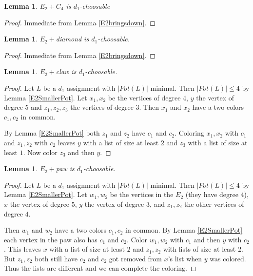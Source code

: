 \documentclass[12pt]{article}
\theoremstyle{plain}
\newtheorem{lem}[thm]{Lemma}
\theoremstyle{definition}
\theoremstyle{remark}
\begin{document}
\begin{lem}\label{E2PlusC4}
$E_2 + C_4$ is $d_1$-choosable
\end{lem}
\begin{proof}
Immediate from Lemma \ref{E2bringsdown}.
\end{proof}
\begin{lem}\label{E2PlusDiamond}
$E_2 +$diamond is $d_1$-choosable.
\end{lem}
\begin{proof}
Immediate from Lemma \ref{E2bringsdown}.
\end{proof}
\begin{lem}\label{E2PlusClaw}
$E_2 + $claw is $d_1$-choosable.
\end{lem}
\begin{proof}
Let $L$ be a $d_1$-assignment with $|Pot(L)|$ minimal. Then  $|Pot(L)| \leq 4$ by Lemma \ref{E2SmallerPot}.  Let $x_1, x_2$ be the vertices of degree $4$, $y$ the vertex of degree $5$ and $z_1, z_2, z_3$ the vertices of degree $3$.  Then $x_1$ and $x_2$ have a two colors $c_1, c_2$ in common.\newline

By Lemma \ref{E2SmallerPot} both $z_1$ and $z_2$ have $c_1$ and $c_2$. Coloring $x_1, x_2$ with $c_1$ and $z_1, z_2$ with $c_2$ leaves $y$ with a list of size at least $2$ and $z_3$ with a list of size at least $1$.  Now color $z_3$ and then $y$.\newline
\end{proof}

\begin{lem}\label{E2PlusPaw}
$E_2 + $paw is $d_1$-choosable.
\end{lem}
\begin{proof}
Let $L$ be a $d_1$-assignment with $|Pot(L)|$ minimal. Then $|Pot(L)| \leq 4$ by Lemma \ref{E2SmallerPot}.  Let $w_1, w_2$ be the vertices in the $E_2$ (they have degree $4$), $x$ the vertex of degree $5$, $y$ the vertex of degree $3$, and $z_1, z_2$ the other vertices of degree $4$.\newline

Then $w_1$ and $w_2$ have a two colors $c_1, c_2$ in common. By Lemma \ref{E2SmallerPot} each vertex in the paw also has $c_1$ and $c_2$.  Color $w_1, w_2$ with $c_1$ and then $y$ with $c_2$.  This leaves $x$ with a list of size at least $2$ and $z_1, z_2$ with lists of size at least $2$.  But $z_1, z_2$ both still have $c_2$ and $c_2$ got removed from $x$'s list when $y$ was colored.  Thus the lists are different and we can complete the coloring.
\end{proof}
\end{document}
